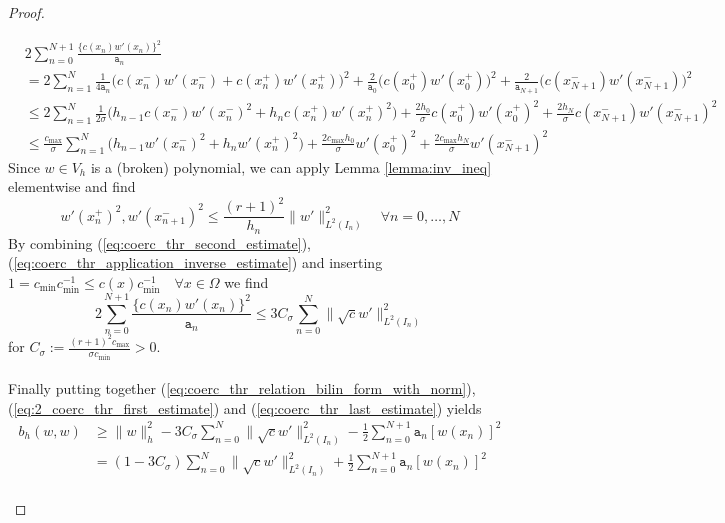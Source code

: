 \begin{proof}
\begin{proofstep}[Coercivity]
		\begin{align}
			\label{eq:coerc_thr_second_estimate}
			 & 2\sum_{n=0}^{N+1} \frac{\{c(x_n)w'(x_n)\}^2}{\texttt{a}_n} \nonumber        \\
			 & = 2\sum_{n=1}^{N} \frac{1}{4\texttt{a}_n}
			\Big( c(x_n^-)w'(x_n^-) + c(x_n^+)w'(x_n^+) \Big)^2 + \frac{2}{\texttt{a}_0} \Big( c(x_0^+)w'(x_0^+) \Big)^2
			+ \frac{2}{\texttt{a}_{N+1}} \Big( c(x_{N+1}^-)w'(x_{N+1}^-) \Big)^2 \nonumber \\
			 & \leq 2\sum_{n=1}^{N} \frac{1}{2\sigma}
			\Big( h_{n-1}c(x_n^-)w'(x_n^-)^2 + h_{n}c(x_n^+)w'(x_n^+)^2 \Big) + \frac{2h_0}{\sigma} c(x_0^+)w'(x_0^+)^2
			+ \frac{2h_{N}}{\sigma} c(x_{N+1}^-)w'(x_{N+1}^-)^2 \nonumber                  \\
			 & \leq \frac{c_{\max}}{\sigma}\sum_{n=1}^{N}
			\Big(h_{n-1}w'(x_n^-)^2 + h_{n}w'(x_n^+)^2 \Big) + \frac{2c_{\max}h_0}{\sigma} w'(x_0^+)^2
			+ \frac{2c_{\max}h_{N}}{\sigma} w'(x_{N+1}^-)^2
		\end{align}
		Since $w\in V_h$ is a (broken) polynomial, we can apply Lemma \ref{lemma:inv_ineq} elementwise and find
		\begin{equation}
			\label{eq:coerc_thr_application_inverse_estimate}
			w'(x_n^+)^2,w'(x_{n+1}^-)^2  \leq \frac{(r+1)^2}{h_n} \|w'\|_{L^2(I_n)}^2 \quad \forall n = 0,\ldots,N
		\end{equation}
		By combining (\ref{eq:coerc_thr_second_estimate}), (\ref{eq:coerc_thr_application_inverse_estimate}) and
		inserting $1 = c_{\min}c_{\min}^{-1} \leq c(x)c_{\min}^{-1} \quad \forall x\in\Omega$ we find
		\begin{equation}
			\label{eq:coerc_thr_last_estimate}
			2\sum_{n=0}^{N+1} \frac{\{c(x_n)w'(x_n)\}^2}{\texttt{a}_n} \leq
			3C_{\sigma} \sum_{n=0}^{N} \|\sqrt{c}w'\|_{L^2(I_n)}^2
		\end{equation}
		for $\displaystyle C_{\sigma} := \frac{ (r+1)^2 c_{\max} }{\sigma c_{\min}} > 0$. \\ \\
		Finally putting together (\ref{eq:coerc_thr_relation_bilin_form_with_norm}), (\ref{eq:2_coerc_thr_first_estimate}) and
		(\ref{eq:coerc_thr_last_estimate}) yields
		\begin{align*}
			b_h(w,w) & \geq \|w\|_h^2 - 3C_{\sigma} \sum_{n=0}^{N} \|\sqrt{c}w'\|_{L^2(I_n)}^2
			- \frac{1}{2} \sum_{n=0}^{N+1} \texttt{a}_n [w(x_n)]^2 \nonumber                                                                           \\
			         & = (1 - 3C_{\sigma}) \sum_{n=0}^{N} \|\sqrt{c}w'\|_{L^2(I_n)}^2 + \frac{1}{2} \sum_{n=0}^{N+1} \texttt{a}_n [w(x_n)]^2 \nonumber \\

\end{align*}
\end{proofstep}
\end{proof}
